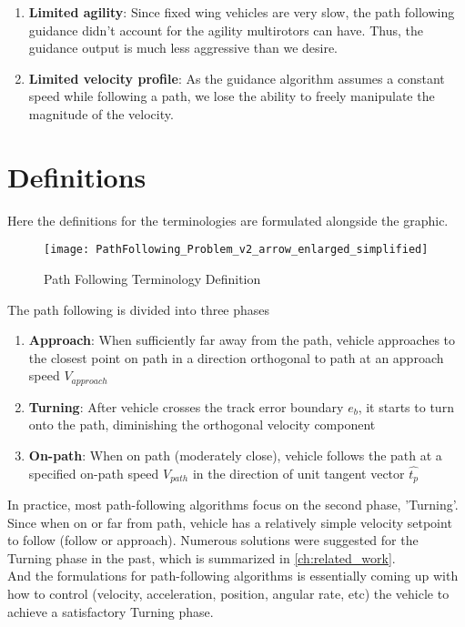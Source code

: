 \begin{enumerate}
    \item \textbf{Limited agility}: Since fixed wing vehicles are very slow, the path following guidance didn't account for the agility multirotors can have. Thus, the guidance output is much less aggressive than we desire.
    \item \textbf{Limited velocity profile}: As the guidance algorithm assumes a constant speed while following a path, we lose the ability to freely manipulate the magnitude of the velocity.
\end{enumerate}

\section{Definitions}
Here the definitions for the terminologies are formulated alongside the graphic.

\begin{figure}[h]
\centering
\texttt{[image: PathFollowing\_Problem\_v2\_arrow\_enlarged\_simplified]}
\caption{Path Following Terminology Definition}
\end{figure}

The path following is divided into three phases

\begin{enumerate}
    \item \textbf{Approach}: When sufficiently far away from the path, vehicle approaches to the closest point on path in a direction orthogonal to path at an approach speed $V_{approach}$
    \item \textbf{Turning}: After vehicle crosses the track error boundary $e_b$, it starts to turn onto the path, diminishing the orthogonal velocity component
    \item \textbf{On-path}: When on path (moderately close), vehicle follows the path at a specified on-path speed $V_{path}$ in the direction of unit tangent vector $\hat{t_p}$
\end{enumerate}

In practice, most path-following algorithms focus on the second phase, 'Turning'. Since when on or far from path, vehicle has a relatively simple velocity setpoint to follow (follow or approach). Numerous solutions were suggested for the Turning phase in the past, which is summarized in \autoref{ch:related_work}.\\

And the formulations for path-following algorithms is essentially coming up with how to control (velocity, acceleration, position, angular rate, etc) the vehicle to achieve a satisfactory Turning phase.\\

